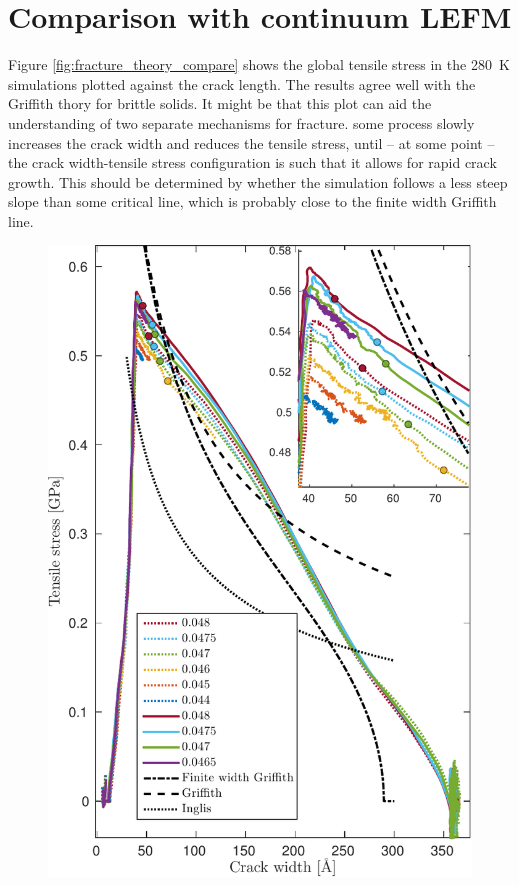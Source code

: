\section{Comparison with continuum LEFM}
Figure \ref{fig:fracture_theory_compare} shows the global tensile stress in the \SI{280}{\kelvin} simulations plotted against the crack length. The results agree well with the Griffith thory for brittle solids. It might be that this plot can aid the understanding of two separate mechanisms for fracture. some process slowly increases the crack width and reduces the tensile stress, until -- at some point -- the crack width-tensile stress configuration is such that it allows for rapid crack growth. This should be determined by whether the simulation follows a less steep slope than some critical line, which is probably close to the finite width Griffith line.
\begin{figure}
\centering
\includegraphics[width=12cm]{../figures/thesis/stress_area_lefm.pdf}

\end{figure}
